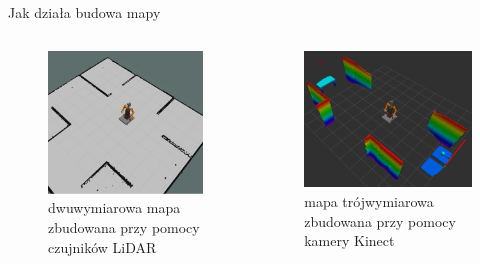 \begin{frame}{Jak działa budowa mapy}
	\begin{columns}
		\begin{column}{0.5\textwidth}
			\begin{figure}
				\centering
				\includegraphics[height=0.6\textheight]{img/mapa_2d.png}
				\caption{dwuwymiarowa mapa zbudowana przy pomocy czujników LiDAR}
			\end{figure}
		\end{column}
		\begin{column}{0.5\textwidth}  %
			\begin{figure}
				\centering
				\includegraphics[height=0.6\textheight]{img/octomapa.png}
				\caption{mapa trójwymiarowa zbudowana przy pomocy kamery Kinect}
			\end{figure}
		\end{column}
	\end{columns}
\end{frame}

